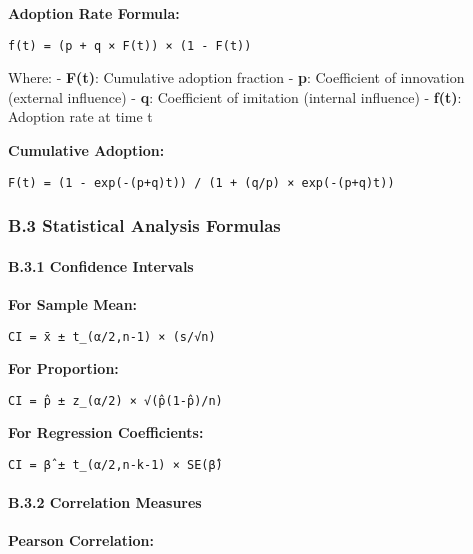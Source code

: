 \documentclass[12pt,a4paper]{article}
\begin{document}
{{{{{\textbf{Adoption Rate Formula:}

\begin{verbatim}
f(t) = (p + q × F(t)) × (1 - F(t))
\end{verbatim}

Where: - \textbf{F(t)}: Cumulative adoption fraction - \textbf{p}:
Coefficient of innovation (external influence) - \textbf{q}: Coefficient
of imitation (internal influence) - \textbf{f(t)}: Adoption rate at time
t

\textbf{Cumulative Adoption:}

\begin{verbatim}
F(t) = (1 - exp(-(p+q)t)) / (1 + (q/p) × exp(-(p+q)t))
\end{verbatim}

\hypertarget{b.3-statistical-analysis-formulas}{%
\subsubsection{B.3 Statistical Analysis
Formulas}\label{b.3-statistical-analysis-formulas}}

\hypertarget{b.3.1-confidence-intervals}{%
\paragraph{B.3.1 Confidence
Intervals}\label{b.3.1-confidence-intervals}}

\textbf{For Sample Mean:}

\begin{verbatim}
CI = x̄ ± t_(α/2,n-1) × (s/√n)
\end{verbatim}

\textbf{For Proportion:}

\begin{verbatim}
CI = p̂ ± z_(α/2) × √(p̂(1-p̂)/n)
\end{verbatim}

\textbf{For Regression Coefficients:}

\begin{verbatim}
CI = β̂ ± t_(α/2,n-k-1) × SE(β̂)
\end{verbatim}

\hypertarget{b.3.2-correlation-measures}{%
\paragraph{B.3.2 Correlation
Measures}\label{b.3.2-correlation-measures}}

\textbf{Pearson Correlation:}

}}}}}
\end{document}
